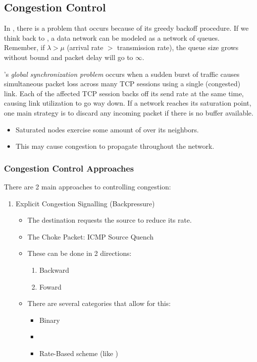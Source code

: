 \subsection{Congestion Control}\label{subsec:Congestion_Control}

In , there is a problem that occurs because of its greedy backoff procedure.
If we think back to , a data network can be modeled as a network of queues.
Remember, if $\lambda > \mu$ (arrival rate $>$ transmission rate), the queue size grows without bound and packet delay will go to $\infty$.

\begin{definition}\label{def:TCP_Global_Synchronization_Problem}
  's \emph{global synchronization problem} occurs when a sudden burst of traffic causes simultaneous packet loss across many TCP sessions using a single (congested) link.
  Each of the affected TCP session backs off its send rate at the same time, causing link utilization to go way down.
If a network reaches its saturation point, one main strategy is to discard any incoming packet if there is no buffer available.
\begin{itemize}[noitemsep]
\item Saturated nodes exercise some amount of  over its neighbors.
\item This may cause congestion to propagate throughout the network.
\end{itemize}

\subsubsection{Congestion Control Approaches}\label{subsubsec:Congestion_Control_Approaches}
There are 2 main approaches to controlling congestion:
\begin{enumerate}[noitemsep]
\item Explicit Congestion Signalling (Backpressure)
  \begin{itemize}[noitemsep]
  \item The destination requests the source to reduce its rate.
  \item The Choke Packet: ICMP Source Quench
  \item These can be done in 2 directions:
    \begin{enumerate}[noitemsep]
    \item Backward
    \item Foward
    \end{enumerate}
  \item There are several categories that allow for this:
    \begin{itemize}[noitemsep]
    \item Binary
    \item {}
    \item Rate-Based scheme (like )
    \end{itemize}
  \end{itemize}


\end{enumerate}
\end{definition}
